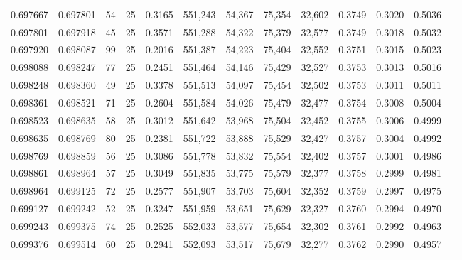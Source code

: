 \begin{tabular}{rrrrrrrrrrrrr}
0.697667 & 0.697801 &    54 &  25 &                                     0.3165 & 551,243 &  54,367 &  75,354 &  32,602 & 0.3749 & 0.3020 & 0.5036 \\
0.697801 & 0.697918 &    45 &  25 &                                     0.3571 & 551,288 &  54,322 &  75,379 &  32,577 & 0.3749 & 0.3018 & 0.5032 \\
0.697920 & 0.698087 &    99 &  25 &                                     0.2016 & 551,387 &  54,223 &  75,404 &  32,552 & 0.3751 & 0.3015 & 0.5023 \\
0.698088 & 0.698247 &    77 &  25 &                                     0.2451 & 551,464 &  54,146 &  75,429 &  32,527 & 0.3753 & 0.3013 & 0.5016 \\
0.698248 & 0.698360 &    49 &  25 &                                     0.3378 & 551,513 &  54,097 &  75,454 &  32,502 & 0.3753 & 0.3011 & 0.5011 \\
0.698361 & 0.698521 &    71 &  25 &                                     0.2604 & 551,584 &  54,026 &  75,479 &  32,477 & 0.3754 & 0.3008 & 0.5004 \\
0.698523 & 0.698635 &    58 &  25 &                                     0.3012 & 551,642 &  53,968 &  75,504 &  32,452 & 0.3755 & 0.3006 & 0.4999 \\
0.698635 & 0.698769 &    80 &  25 &                                     0.2381 & 551,722 &  53,888 &  75,529 &  32,427 & 0.3757 & 0.3004 & 0.4992 \\
0.698769 & 0.698859 &    56 &  25 &                                     0.3086 & 551,778 &  53,832 &  75,554 &  32,402 & 0.3757 & 0.3001 & 0.4986 \\
0.698861 & 0.698964 &    57 &  25 &                                     0.3049 & 551,835 &  53,775 &  75,579 &  32,377 & 0.3758 & 0.2999 & 0.4981 \\
0.698964 & 0.699125 &    72 &  25 &                                     0.2577 & 551,907 &  53,703 &  75,604 &  32,352 & 0.3759 & 0.2997 & 0.4975 \\
0.699127 & 0.699242 &    52 &  25 &                                     0.3247 & 551,959 &  53,651 &  75,629 &  32,327 & 0.3760 & 0.2994 & 0.4970 \\
0.699243 & 0.699375 &    74 &  25 &                                     0.2525 & 552,033 &  53,577 &  75,654 &  32,302 & 0.3761 & 0.2992 & 0.4963 \\
0.699376 & 0.699514 &    60 &  25 &                                     0.2941 & 552,093 &  53,517 &  75,679 &  32,277 & 0.3762 & 0.2990 & 0.4957 \\

\end{tabular}

